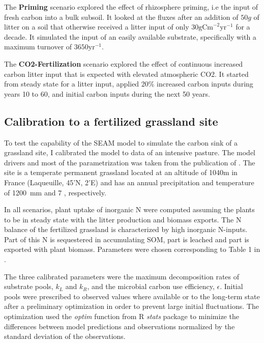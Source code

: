 The \textbf{Priming} scenario explored the effect of rhizosphere priming, i.e
the input of fresh carbon into a bulk subsoil. It looked at the fluxes after
an addition of $50g$ of litter on a soil that otherwise
received a litter input of only $30\mathrm{gCm}^{-2}\mathrm{yr}^{-1}$ for a
decade. It simulated the input of an easily available substrate, specifically
with a maximum turnover of $3650\mathrm{yr}^{-1}$.

The \textbf{CO2-Fertilization} scenario explored the effect of continuous 
increased carbon litter input that is expected with elevated atmospheric CO2.
It started from steady state for a litter input, applied 20\% increased
carbon inputs during years 10 to 60, and initial carbon inputs during the
next 50 years. 

\subsection{Calibration to a fertilized grassland site
\label{sec:methodsPasture}} 

To test the capability of the SEAM model to simulate the carbon sink of a
grassland site, I calibrated the model to data of an intensive pasture. The
model drivers and most of the parametrization was taken from the publication of
\citep{Perveen14}. The site is a temperate permanent grassland
located at an altitude of 1040m in France (Laqueuille, 45'N,
2'E) and has an annual precipitation and temperature of
1200~mm and 7 , respectively. 

In all scenarios, plant uptake of inorganic N were
computed assuming the plants to be in steady state with the litter
production and biomass exports. The N balance of the fertilized grassland is
 characterized by high inorganic N-inputs. Part of this N is sequestered in accumulating SOM, part
is leached and part is exported with plant biomass. Parameters were chosen
corresponding to Table 1 in \citep{Perveen14}. 

The three calibrated parameters were the maximum decomposition rates of
substrate pools, $k_L$ and $k_R$, and the microbial carbon use efficiency,
$\epsilon$. Initial pools were prescribed to observed values where available or
to the long-term state after a preliminary optimization in order to prevent
large initial fluctuations. The optimization used the \textit{optim}
function from R \textit{stats} package \citep{R07} to minimize the differences
between model predictions and observations normalized by the standard deviation
of the observations.
 
